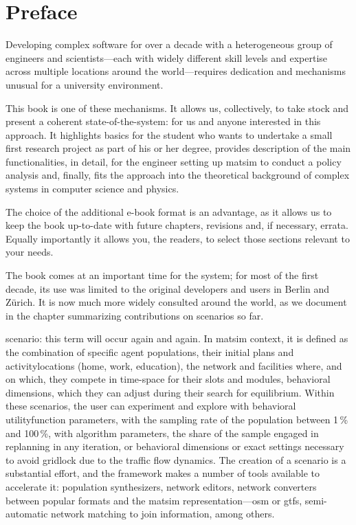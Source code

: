 \chapter*{Preface}



Developing complex software for over a decade with a heterogeneous group of engineers and scientists---each with widely different skill levels and expertise across multiple locations around the world---requires dedication and mechanisms unusual for a university environment. 

This book is one of these mechanisms. It allows us, collectively, to take stock and present a coherent state-of-the-system: for us and anyone interested in this approach. It highlights  basics for the student who wants to undertake a small first research project as part of his or her degree, provides description of the main functionalities, in detail, for the engineer setting up \gls{matsim} to conduct a policy analysis and, finally, fits the approach into the theoretical background of complex systems in computer science and physics. 

The choice of the additional e-book format is an advantage, as it allows us to keep the book up-to-date with future chapters, revisions and, if necessary, errata. Equally importantly it allows you, the readers, to select those sections relevant to your needs. 

The book comes at an important time for the system; for most of the first decade, its use was limited to the original developers and users in Berlin and Zürich. It is now much more widely consulted around the world, as we document in the chapter summarizing contributions on \glspl{scenario} so far. 

\Gls{scenario}: this term will occur again and again. In \gls{matsim} context, it is defined as the combination of specific agent populations, their initial \glspl{plan} and \glspl{activitylocation} (home, work, education), the network and facilities where, and on which, they compete in time-space for their slots and modules, \ie behavioral dimensions, which they can adjust during their search for equilibrium. Within these \glspl{scenario}, the user can experiment and explore with behavioral \gls{utilityfunction} parameters, with the sampling rate of the population between 1\,\% and 100\,\%, with algorithm parameters, \eg the share of the sample engaged in \gls{replanning} in any \gls{iteration}, or behavioral dimensions or exact settings necessary to avoid gridlock due to the traffic flow dynamics.
The creation of a \gls{scenario} is a substantial effort, and the \gls{framework} makes a number of tools available to accelerate it: population synthesizers, network editors, network converters between popular formats and the \gls{matsim} representation---\eg \gls{osm} or \gls{gtfs}, semi-automatic network matching to join information, among others.


